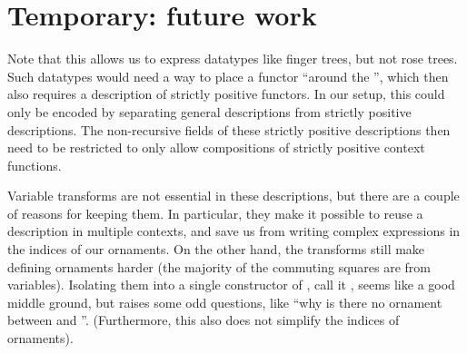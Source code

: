 \section{Temporary: future work}
\begin{remark}
    Note that this allows us to express datatypes like finger trees, but not rose trees. Such datatypes would need a way to place a functor ``around the '', which then also requires a description of strictly positive functors. In our setup, this could only be encoded by separating general descriptions from strictly positive descriptions. The non-recursive fields of these strictly positive descriptions then need to be restricted to only allow compositions of strictly positive context functions. 
\end{remark} %

\begin{remark}
    Variable transforms are not essential in these descriptions, but there are a couple of reasons for keeping them. In particular, they make it possible to reuse a description in multiple contexts, and save us from writing complex expressions in the indices of our ornaments. On the other hand, the transforms still make defining ornaments harder (the majority of the commuting squares are from variables). Isolating them into a single constructor of , call it , seems like a good middle ground, but raises some odd questions, like ``why is there no ornament between  and ''. (Furthermore, this also does not simplify the indices of ornaments).
\end{remark} %

